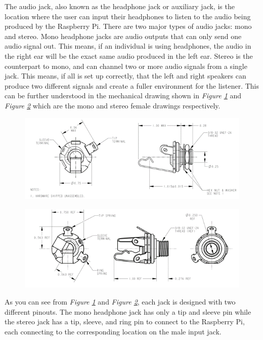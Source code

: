 The audio jack, also known as the headphone jack or auxiliary jack, is the location where the user can input their headphones to listen to the audio being produced by the Raspberry Pi. There are two major types of audio jacks: mono and stereo. Mono headphone jacks are audio outputs that can only send one audio signal out. This means, if an individual is using headphones, the audio in the right ear will be the exact same audio produced in the left ear. Stereo is the counterpart to mono, and can channel two or more audio signals from a single jack. This means, if all is set up correctly, that the left and right speakers can produce two different signals and create a fuller environment for the listener. This can be further understood in the mechanical drawing shown in \textit{Figure \ref{fig:mono}} and \textit{Figure \ref{fig:stereo}} which are the mono and stereo female drawings respectively.

\begin{figure}[h!]
  \centering
  \includegraphics[width=\linewidth]{image/Mono.png}
  \caption{}
  \label{fig:mono}
\end{figure}
\begin{figure}[h!]
  \centering
  \includegraphics[width=\linewidth]{image/Stereo.png}
  \caption{}
  \label{fig:stereo}
\end{figure}

As you can see from \textit{Figure \ref{fig:mono}} and \textit{Figure \ref{fig:stereo}}, each jack is designed with two different pinouts. The mono headphone jack has only a tip and sleeve pin while the stereo jack has a tip, sleeve, and ring pin to connect to the Raspberry Pi,  each connecting to the corresponding location on the male input jack.

